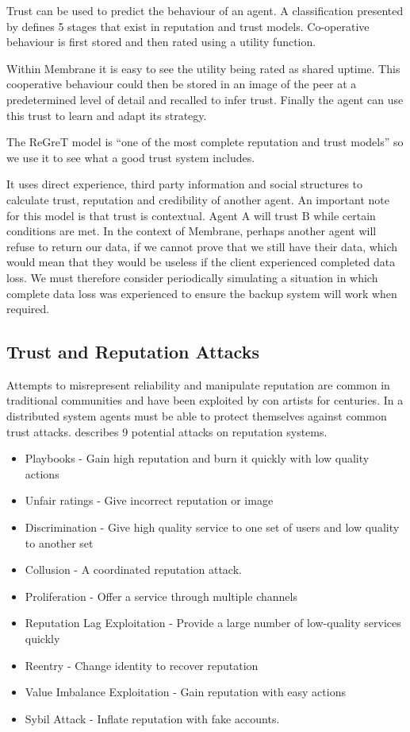 \documentclass[11pt, a4paper, twoside]{report}
\begin{document}
Trust can be used to predict the behaviour of an agent. \citep{wooldridge2009introduction} A classification presented by \cite{balke2009using} defines 5 stages that exist in reputation and trust models. Co-operative behaviour is first stored and then rated using a utility function.

Within Membrane it is easy to see the utility being rated as shared uptime. This cooperative behaviour could then be stored in an image of the peer at a predetermined level of detail and recalled to infer trust. Finally the agent can use this trust to learn and adapt its strategy.

The ReGreT model \citep{sabater2001regret} is ``one of the most complete reputation and trust models'' \citep{pinyol2013computational} so we use it to see what a good trust system includes.

It uses direct experience, third party information and social structures to calculate trust, reputation and credibility of another agent. An important note for this model is that trust is contextual. Agent A will trust B while certain conditions are met. In the context of Membrane, perhaps another agent will refuse to return our data, if we cannot prove that we still have their data, which would mean that they would be useless if the client experienced completed data loss. We must therefore consider periodically simulating a situation in which complete data loss was experienced to ensure the backup system will work when required.

\subsection{Trust and Reputation Attacks} \label{sec:tar}

Attempts to misrepresent reliability and manipulate reputation are common in traditional communities and have been exploited by con artists for centuries. In a distributed system agents must be able to protect themselves against common trust attacks. \cite{josang2009challenges} describes 9 potential attacks on reputation systems.

\begin{itemize}
 \item Playbooks - Gain high reputation and burn it quickly with low quality actions
 \item Unfair ratings - Give incorrect reputation or image
 \item Discrimination - Give high quality service to one set of users and low quality to another set
 \item Collusion - A coordinated reputation attack.
 \item Proliferation - Offer a service through multiple channels
 \item Reputation Lag Exploitation - Provide a large number of low-quality services quickly
 \item Reentry - Change identity to recover reputation
 \item Value Imbalance Exploitation - Gain reputation with easy actions
 \item Sybil Attack - Inflate reputation with fake accounts.
\end{itemize}
\end{document}
